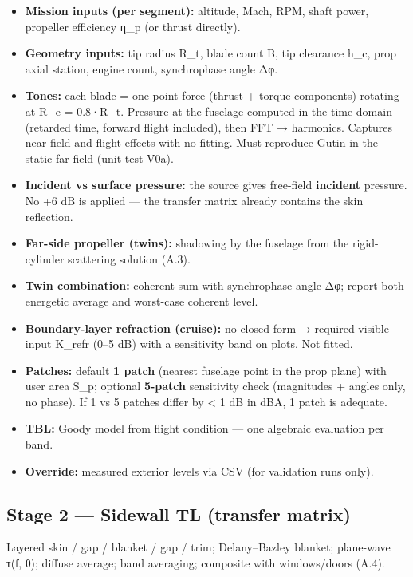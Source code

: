 \documentclass[10pt,a4paper]{article}
\begin{document}
\begin{itemize}
\item \textbf{Mission inputs (per segment):} altitude, Mach, RPM, shaft power, propeller efficiency η\_p (or thrust directly).
\item \textbf{Geometry inputs:} tip radius R\_t, blade count B, tip clearance h\_c, prop axial station, engine count, synchrophase angle Δφ.
\item \textbf{Tones:} each blade = one point force (thrust + torque components) rotating at R\_e = 0.8·R\_t. Pressure at the fuselage computed in the time domain (retarded time, forward flight included), then FFT → harmonics. Captures near field and flight effects with no fitting. Must reproduce Gutin in the static far field (unit test V0a).
\item \textbf{Incident vs surface pressure:} the source gives free-field \textbf{incident} pressure. No +6 dB is applied — the transfer matrix already contains the skin reflection.
\item \textbf{Far-side propeller (twins):} shadowing by the fuselage from the rigid-cylinder scattering solution (A.3).
\item \textbf{Twin combination:} coherent sum with synchrophase angle Δφ; report both energetic average and worst-case coherent level.
\item \textbf{Boundary-layer refraction (cruise):} no closed form → required visible input K\_refr (0–5 dB) with a sensitivity band on plots. Not fitted.
\item \textbf{Patches:} default \textbf{1 patch} (nearest fuselage point in the prop plane) with user area S\_p; optional \textbf{5-patch} sensitivity check (magnitudes + angles only, no phase). If 1 vs 5 patches differ by < 1 dB in dBA, 1 patch is adequate.
\item \textbf{TBL:} Goody model from flight condition — one algebraic evaluation per band.
\item \textbf{Override:} measured exterior levels via CSV (for validation runs only).
\end{itemize}

\subsection*{Stage 2 — Sidewall TL (transfer matrix)}

Layered skin / gap / blanket / gap / trim; Delany–Bazley blanket; plane-wave τ(f, θ); diffuse average; band averaging; composite with windows/doors (A.4).
\end{document}
